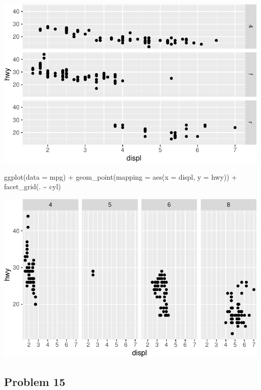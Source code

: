 \documentclass[
  letterpaper,
  DIV=11,
  numbers=noendperiod]{scrreprt}
\newenvironment{Shaded}{\begin{snugshade}}{\end{snugshade}}
\newcommand{\AttributeTok}[1]{\textcolor[rgb]{0.40,0.45,0.13}{#1}}
\newcommand{\FunctionTok}[1]{\textcolor[rgb]{0.28,0.35,0.67}{#1}}
\newcommand{\NormalTok}[1]{\textcolor[rgb]{0.00,0.23,0.31}{#1}}
\newcommand{\SpecialCharTok}[1]{\textcolor[rgb]{0.37,0.37,0.37}{#1}}
\begin{document}
\includegraphics{Beginning_Data_Visualization_files/figure-pdf/Ex 14-1.pdf}

\begin{Shaded}
\begin{Highlighting}[]
\FunctionTok{ggplot}\NormalTok{(}\AttributeTok{data =}\NormalTok{ mpg) }\SpecialCharTok{+} 
  \FunctionTok{geom\_point}\NormalTok{(}\AttributeTok{mapping =} \FunctionTok{aes}\NormalTok{(}\AttributeTok{x =}\NormalTok{ displ, }\AttributeTok{y =}\NormalTok{ hwy)) }\SpecialCharTok{+}
 \FunctionTok{facet\_grid}\NormalTok{(. }\SpecialCharTok{\textasciitilde{}}\NormalTok{ cyl)}
\end{Highlighting}
\end{Shaded}

\includegraphics{Beginning_Data_Visualization_files/figure-pdf/Ex 14-2.pdf}

\subsection*{Problem 15}\label{problem-15-1}
\end{document}
